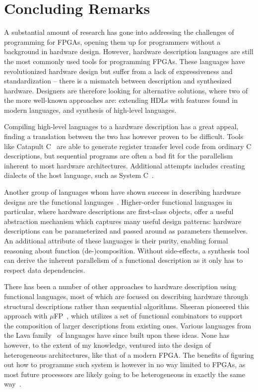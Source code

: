 \documentclass[../main.tex]{subfiles}
\begin{document}
\chapter{Concluding Remarks}
\label{related}

A substantial amount of research has gone into addressing the challenges of programming for FPGAs, opening them up for programmers without a background in hardware design. However, hardware description languages are still the most commonly used tools for programming FPGAs. These languages have revolutionized hardware design but suffer from a lack of expressiveness and standardization -- there is a mismatch between description and synthesized hardware. Designers are therefore looking for alternative solutions, where two of the more well-known approaches are: extending HDLs with features found in modern languages, and synthesis of high-level languages.

Compiling high-level languages to a hardware description has a great appeal, finding a translation between the two has however proven to be difficult. Tools like Catapult C~\cite{graphics2008} are able to generate register transfer level code from ordinary C descriptions, but sequential programs are often a bad fit for the parallelism inherent to most hardware architectures. Additional attempts includes creating dialects of the host language, such as System C~\cite{ghenassia2005}.

Another group of languages whom have shown success in describing hardware designs are the functional languages~\cite{sheeran2005}. Higher-order functional languages in particular, where hardware descriptions are first-class objects, offer a useful abstraction mechanism which captures many useful design patterns: hardware descriptions can be parameterized and passed around as parameters themselves. An additional attribute of these languages is their purity, enabling formal reasoning about function (de-)composition. Without side-effects, a synthesis tool can derive the inherent parallelism of a functional description as it only has to respect data dependencies.

There has been a number of other approaches to hardware description using functional languages, most of which are focused on describing hardware through structural descriptions rather than sequential algorithms. Sheeran pioneered this approach with $\mu$FP~\cite{sheeran1984}, which utilizes a set of functional combinators to support the composition of larger descriptions from existing ones. Various languages from the Lava family~\cite{bjesse1998, gill2010} of languages have since built upon these ideas. None has however, to the extent of my knowledge, ventured into the design of heterogeneous architectures, like that of a modern FPGA. The benefits of figuring out how to programme such system is however in no way limited to FPGAs, as most future processors are likely going to be heterogeneous in exactly the same way~\cite{sheeran2015}.
\end{document}
